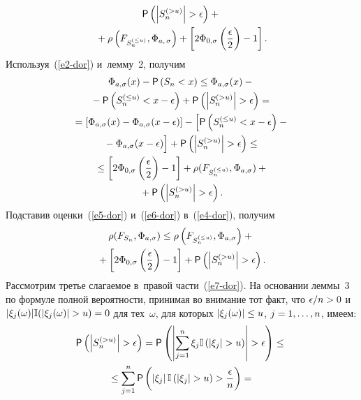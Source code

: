 \begin{multicols}{2}
\begin{multline}
{\sf P}\left(\left\vert S_n^{(>u)}\right\vert >\epsilon\right)+{}\\
{}+
\rho\left(F_{S_n^{(\le u)}},\Phi_{a,\,\sigma}\right)+
\left[2\Phi_{0,\sigma}\left({\displaystyle\frac{\displaystyle \epsilon\mathstrut}{\displaystyle 2\mathstrut}}\right)-1\right].
\label{e5-dor}
\end{multline}
Используя~(\ref{e2-dor}) и~лемму~2, получим
\begin{multline}
\Phi_{a,\sigma}(x)-{\sf P}\left(S_n<x\right)\le 
\Phi_{a,\sigma}(x)-{}\\
{}-{\sf P}\left(S_n^{(\le u)}<x-\epsilon\right)+{\sf P}\left(\left\vert S_n^{(>u)}\right\vert
>\epsilon\right)={}
\\
{}=\left[\Phi_{a,\sigma}(x)-\Phi_{a,\sigma}(x-\epsilon)\right]-
\left[{\sf P}\left(S_n^{(\le u)}<x-\epsilon\right)-{}\right.\\
\left.{}-\Phi_{a,\sigma}(x-\epsilon)
\vphantom{\left(S_n^{(\le u)}<x-\epsilon\right)}
\right]+ 
{\sf P}\left(\left\vert S_n^{(>u)}\right\vert>\epsilon\right) \le
{}\\
{}\le\left[2\Phi_{0,\sigma}\left({\fr{\epsilon}{2}}\right)-1\right]+
\rho(F_{S_n^{(\le u)}},\Phi_{a,\sigma})+{}\\
{}+{\sf P}\left(\left\vert S_n^{(>u)}\right\vert>\epsilon\right).
\label{e6-dor}
\end{multline}
Подставив оценки~(\ref{e5-dor}) и~(\ref{e6-dor}) в~(\ref{e4-dor}), получим
\begin{multline}
\rho(F_{S_n},\Phi_{a,\sigma})\le\rho\left(F_{S_n^{(\le u)}},\Phi_{a,\sigma}\right)+{}\\
{}+
\left[2\Phi_{0,\sigma}\left({\displaystyle\frac{\displaystyle \epsilon\mathstrut}{\displaystyle 2\mathstrut}}\right)-1\right]+
{\sf P}\left(\left\vert S_n^{(>u)}\right\vert >\epsilon\right).
\label{e7-dor}
\end{multline}
Рассмотрим третье слагаемое в~правой части~(\ref{e7-dor}). На основании леммы~3 
по формуле полной ве\-ро\-ят\-ности, принимая во внимание тот факт, что 
${\epsilon}/{n}\hm>0$ и~$|\xi_j(\omega)|\mathbb{I}(|\xi_j(\omega)|>u)\hm=0$ для тех~$\omega$, 
для которых $|\xi_j(\omega)|\hm\le u$, $j\hm=1,\ldots,n$, имеем:
\begin{multline}
{\sf P}\left(\left\vert S_n^{(>u)}\right\vert > \epsilon\right)=
{\sf P}\left(\left\vert \sum\limits_{j=1}^n\xi_j\mathbb{I}
\left(\left\vert \xi_j\right\vert >u\right)\right\vert>\epsilon\right)\le{}\\
{}\le
\sum\limits_{j=1}^n{\sf P}\left(
\left\vert \xi_j\right\vert \mathbb{I}\left(\left\vert \xi_j\right\vert >u\right)>
{\fr{\epsilon}{n}}\right)=
{}\\

\end{multline}
\end{multicols}
